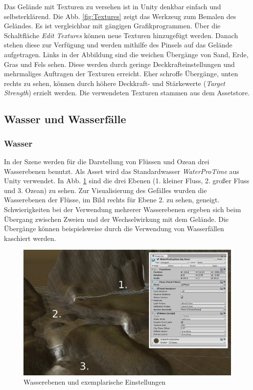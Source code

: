 Das Gelände mit Texturen zu versehen ist in Unity denkbar einfach und selbsterklärend. Die Abb. \ref{fig:Textures} zeigt das Werkzeug zum Bemalen des Geländes. Es ist vergleichbar mit gängigen Grafikprogrammen. Über die Schaltfläche \textit{Edit Textures} können neue Texturen hinzugefügt werden. Danach stehen diese zur Verfügung und werden mithilfe des Pinsels auf das Gelände aufgetragen. Links in der Abbildung sind die weichen Übergänge von Sand, Erde, Gras und Fels sehen. Diese werden durch geringe Deckkrafteinstellungen und mehrmaliges Auftragen der Texturen erreicht. Eher schroffe Übergänge, unten rechts zu sehen, können durch höhere Deckkraft- und Stärkewerte (\textit{Target Strength}) erzielt werden. Die verwendeten Texturen stammen aus dem Assetstore.

\subsection{Wasser und Wasserfälle}
\subsubsection{Wasser}
In der Szene werden für die Darstellung von Flüssen und Ozean drei Wasserebenen benutzt. Als Asset wird das Standardwasser \textit{WaterProTime} aus Unity verwendet. In Abb. \ref{fig:Water} sind die drei Ebenen (1. kleiner Fluss, 2. großer Fluss und 3. Ozean) zu sehen. Zur Visualisierung des Gefälles wurden die Wasserebenen der Flüsse, im Bild rechts für Ebene 2. zu sehen, geneigt. Schwierigkeiten bei der Verwendung mehrerer Wasserebenen ergeben sich beim Übergang zwischen Zweien und der Wechselwirkung mit dem Gelände. Die Übergänge können beispielsweise durch die Verwendung von Wasserfällen kaschiert werden. 

\begin{figure}[h]
	\centering
	\includegraphics[width=0.95\linewidth]{Abbildungen/Unity/Water}
	\caption{Wasserebenen und exemplarische Einstellungen}
	\label{fig:Water}
\end{figure}

